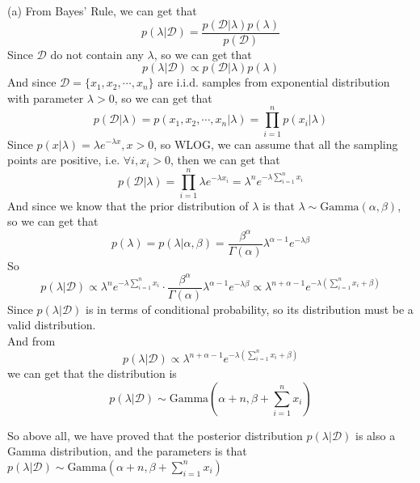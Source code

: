 (a) From Bayes' Rule, we can get that
$$p(\lambda|\mathcal{D})=\dfrac{p(\mathcal{D}|\lambda)p(\lambda)}{p(\mathcal{D})}$$
Since $\mathcal{D}$ do not contain any $\lambda$, so we can get that
$$p(\lambda|\mathcal{D})\propto p(\mathcal{D}|\lambda)p(\lambda)$$
And since $\mathcal{D}=\{x_1,x_2,\cdots,x_n\}$ are i.i.d. samples from exponential distribution with parameter $\lambda > 0$, so we can get that
$$p(\mathcal{D}|\lambda)=p(x_1,x_2,\cdots,x_n|\lambda)=\prod\limits_{i=1}^np(x_i|\lambda)$$
Since $p(x|\lambda)=\lambda e^{-\lambda x},x>0$, so WLOG, we can assume that all the sampling points are positive,
i.e. $\forall i, x_i>0$, then we can get that
$$p(\mathcal{D}|\lambda)=\prod\limits_{i=1}^n\lambda e^{-\lambda x_i}=\lambda^n e^{-\lambda\sum\limits_{i=1}^nx_i}$$
And since we know that the prior distribution of $\lambda$ is that $\lambda\sim \text{Gamma}(\alpha,\beta)$,
so we can get that
$$p(\lambda)=p(\lambda|\alpha,\beta)=\dfrac{\beta^{\alpha}}{\Gamma(\alpha)} \lambda^{\alpha-1}e^{-\lambda\beta}$$
So
$$p(\lambda|\mathcal{D})\propto \lambda^n e^{-\lambda\sum\limits_{i=1}^nx_i}\cdot\dfrac{\beta^{\alpha}}{\Gamma(\alpha)} \lambda^{\alpha-1}e^{-\lambda\beta}\propto\lambda^{n+\alpha-1}e^{-\lambda\left(\sum\limits_{i=1}^nx_i+\beta\right)}$$
Since $p(\lambda|\mathcal{D})$ is in terms of conditional probability, so its distribution must be a valid distribution.\\
And from $$p(\lambda|\mathcal{D})\propto\lambda^{n+\alpha-1}e^{-\lambda\left(\sum\limits_{i=1}^nx_i+\beta\right)}$$
we can get that the distribution is $$p(\lambda|\mathcal{D})\sim \text{Gamma}\left(\alpha+n,\beta+\sum\limits_{i=1}^nx_i\right)$$

So above all, we have proved that the posterior distribution $p(\lambda|\mathcal{D})$ is also a Gamma distribution, and the parameters is that $p(\lambda|\mathcal{D})\sim \text{Gamma}\left(\alpha+n,\beta+\sum\limits_{i=1}^nx_i\right)$

